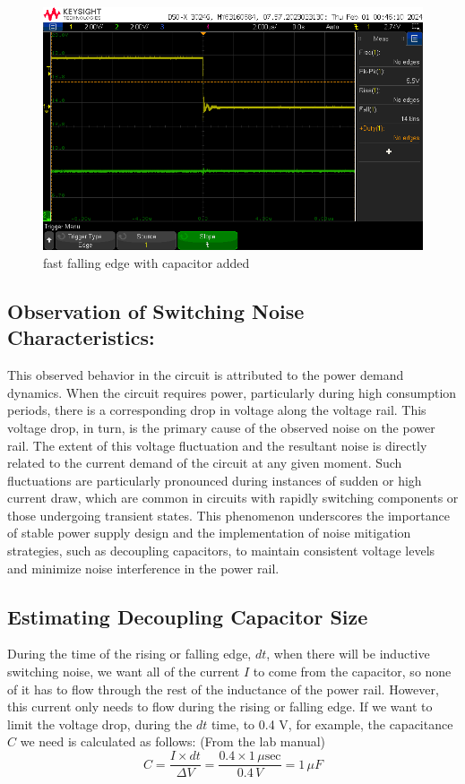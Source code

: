 \documentclass[a4paper,11pt]{article}%
\begin{document}
		\begin{figure}[H]
			\centering
			\includegraphics[scale=0.6]{figures/fast_fall_cap.png}
			\caption{fast falling edge with capacitor added}
		\end{figure}
		
		\subsection{Observation of Switching Noise Characteristics:}

		
This observed behavior in the circuit is attributed to the power demand dynamics. When the circuit requires power, particularly during high consumption periods, there is a corresponding drop in voltage along the voltage rail. This voltage drop, in turn, is the primary cause of the observed noise on the power rail. The extent of this voltage fluctuation and the resultant noise is directly related to the current demand of the circuit at any given moment. Such fluctuations are particularly pronounced during instances of sudden or high current draw, which are common in circuits with rapidly switching components or those undergoing transient states. This phenomenon underscores the importance of stable power supply design and the implementation of noise mitigation strategies, such as decoupling capacitors, to maintain consistent voltage levels and minimize noise interference in the power rail.






		

		\subsection{Estimating Decoupling Capacitor Size}
		During the time of the rising or falling edge, \( dt \), when there will be inductive switching noise, we want all of the current \( I \) to come from the capacitor, so none of it has to flow through the rest of the inductance of the power rail. However, this current only needs to flow during the rising or falling edge. If we want to limit the voltage drop, during the \( dt \) time, to 0.4 V, for example, the capacitance \( C \) we need is calculated as follows:
	(From the lab manual)
		\begin{equation}
		C = \frac{I \times dt}{\Delta V} = \frac{0.4 \times 1\, \mu\text{sec}}{0.4\, V} = 1\, \mu F
		\end{equation}
\end{document}
